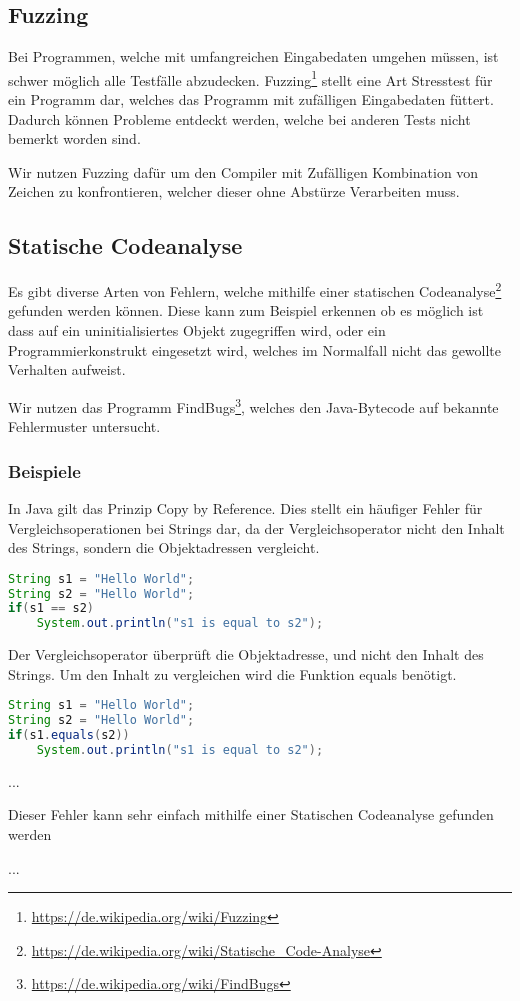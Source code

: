 \subsection{Fuzzing}

Bei Programmen, welche mit umfangreichen Eingabedaten umgehen m\"ussen, ist schwer m\"oglich alle Testf\"alle abzudecken. Fuzzing\footnote{\url{https://de.wikipedia.org/wiki/Fuzzing}} stellt eine Art Stresstest f\"ur ein Programm dar, welches das Programm mit zuf\"alligen Eingabedaten f\"uttert. Dadurch k\"onnen Probleme entdeckt werden, welche bei anderen Tests nicht bemerkt worden sind.

Wir nutzen Fuzzing daf\"ur um den Compiler mit Zuf\"alligen Kombination von Zeichen zu konfrontieren, welcher dieser ohne Abst\"urze Verarbeiten muss.

\subsection{Statische Codeanalyse}

Es gibt diverse Arten von Fehlern, welche mithilfe einer statischen Codeanalyse\footnote{\url{https://de.wikipedia.org/wiki/Statische_Code-Analyse}} gefunden werden k\"onnen. Diese kann zum Beispiel erkennen ob es m\"oglich ist dass auf ein uninitialisiertes Objekt zugegriffen wird, oder ein Programmierkonstrukt eingesetzt wird, welches im Normalfall nicht das gewollte Verhalten aufweist.

Wir nutzen das Programm FindBugs\footnote{\url{https://de.wikipedia.org/wiki/FindBugs}}, welches den Java-Bytecode auf bekannte Fehlermuster untersucht.

\subsubsection{Beispiele}


In Java gilt das Prinzip Copy by Reference. Dies stellt ein h\"aufiger Fehler f\"ur Vergleichsoperationen bei Strings dar, da der Vergleichsoperator nicht den Inhalt des Strings, sondern die Objektadressen vergleicht.

\begin{lstlisting}[language=Java]
String s1 = "Hello World";
String s2 = "Hello World";
if(s1 == s2)
	System.out.println("s1 is equal to s2");
\end{lstlisting}

Der Vergleichsoperator \"uberpr\"uft die Objektadresse, und nicht den Inhalt des Strings. Um den Inhalt zu vergleichen wird die Funktion equals ben\"otigt.

\begin{lstlisting}[language=Java]
String s1 = "Hello World";
String s2 = "Hello World";
if(s1.equals(s2))
	System.out.println("s1 is equal to s2");
\end{lstlisting}


...

Dieser Fehler kann sehr einfach mithilfe einer Statischen Codeanalyse gefunden werden

...
